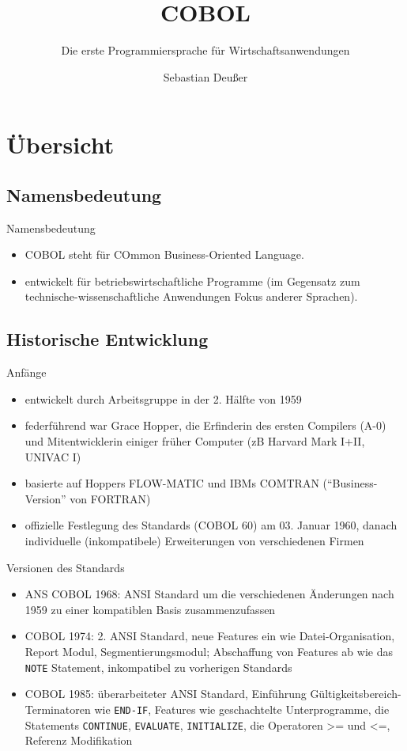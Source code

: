 \documentclass[handout]{beamer}
\title[COBOL-\"Uberblick]   %
{COBOL}
\subtitle
{Die erste Programmiersprache für Wirtschaftsanwendungen} %
\author %
{Sebastian Deußer}
\begin{document}
\begin{frame}
  \titlepage
\end{frame}

\section{Übersicht}

\subsection{Namensbedeutung}

\begin{frame}{Namensbedeutung}
	\begin{itemize}
		\item
			COBOL steht für COmmon Business-Oriented Language.
		\item
			entwickelt für betriebswirtschaftliche Programme (im Gegensatz zum technische-wissenschaftliche Anwendungen Fokus anderer Sprachen).
	\end{itemize}
\end{frame}

\subsection{Historische Entwicklung}

\begin{frame}{Anfänge}
	\begin{itemize}
		\item
			entwickelt durch Arbeitsgruppe in der 2. H\"alfte von 1959
		\item
			federführend war Grace Hopper, die Erfinderin des ersten Compilers (A-0) und Mitentwicklerin einiger fr\"uher Computer (zB Harvard Mark I+II, UNIVAC I)
		\item
			basierte auf Hoppers FLOW-MATIC und IBMs COMTRAN (``Business-Version'' von FORTRAN)
		\item
		offizielle Festlegung des Standards (COBOL 60) am 03. Januar 1960, danach individuelle (inkompatibele) Erweiterungen von verschiedenen Firmen
	\end{itemize}
\end{frame}

\begin{frame}{Versionen des Standards}
	\begin{itemize}
		\item
			ANS COBOL 1968: ANSI Standard um die verschiedenen \"Anderungen nach 1959 zu einer kompatiblen Basis zusammenzufassen
		\item
			COBOL 1974: 2. ANSI Standard, neue Features ein wie Datei-Organisation, Report Modul, Segmentierungsmodul; Abschaffung von Features ab wie das \texttt{NOTE} Statement, inkompatibel zu vorherigen Standards
		\item
			COBOL 1985: \"uberarbeiteter ANSI Standard, Einf\"uhrung G\"ultigkeitsbereich-Terminatoren wie \texttt{END-IF}, Features wie geschachtelte Unterprogramme, die Statements \texttt{CONTINUE}, \texttt{EVALUATE}, \texttt{INITIALIZE}, die Operatoren >= und <=, Referenz Modifikation
	\end{itemize}
\end{frame}
\end{document}
